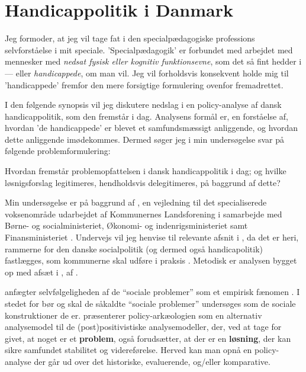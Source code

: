 \section{Handicappolitik i Danmark}

Jeg formoder, at jeg vil tage fat i den specialpædagogiske professions selvforståelse i mit speciale.
'Specialpædagogik' er forbundet med arbejdet med mennesker med \textit{nedsat fysisk eller kognitiv funktionsevne}, som det så fint hedder i  — eller \textit{handicappede}, om man vil. Jeg vil forholdsvis konsekvent holde mig til 'handicappede' fremfor den mere forsigtige formulering ovenfor fremadrettet.

I den følgende synopsis vil jeg diskutere nedslag i en policy-analyse af dansk handicappolitik, som den fremstår i dag.
Analysens formål er, en forståelse af, hvordan 'de handicappede' er blevet et samfundsmæssigt anliggende, og hvordan dette anliggende imødekommes.
Dermed søger jeg i min undersøgelse svar på følgende problemformulering:

Hvordan fremstår problemopfattelsen i dansk handicappolitik i dag; og hvilke løsnigsforslag legitimeres, hendholdsvis delegitimeres, på baggrund af dette?

Min undersøgelse er på baggrund af , en vejledning til det specialiserede voksenområde udarbejdet af Kommunernes Landsforening i samarbejde med Børne- og socialministeriet, Økonomi- og indenrigsministeriet samt Finansministeriet \autocite{klStyringAfDet2017}.
Undervejs vil jeg henvise til relevante afsnit i , da det er heri, rammerne for den danske socialpolitik (og dermed også handicapolitik) fastlægges, som kommunerne skal udføre i praksis \autocite[kapitel 2]{social-ogindenrigsministerietBekendtgorelseAfLov2019}. 
Metodisk er analysen bygget op med afsæt i , af \citeauthor{scheurichPolicyArchaeologyNew1994}.

\citeauthor{scheurichPolicyArchaeologyNew1994}  anfægter selvfølgeligheden af de “sociale problemer” som et empirisk fænomen \autocite[s. ??]{scheurichPolicyArchaeologyNew1994}.
I stedet for bør og skal de såkaldte “sociale problemer” undersøges som de sociale konstruktioner de er.
\citeauthor{scheurichPolicyArchaeologyNew1994} præsenterer policy-arkæologien som en alternativ analysemodel til de (post)positivistiske analysemodeller, der, ved at tage for givet, at noget er et \textbf{problem}, også forudsætter, at der er en \textbf{løsning}, der kan sikre samfundet stabilitet og videreførelse.
Herved kan man opnå en policy-analyse der går ud over det historiske, evaluerende, og/eller komparative.

